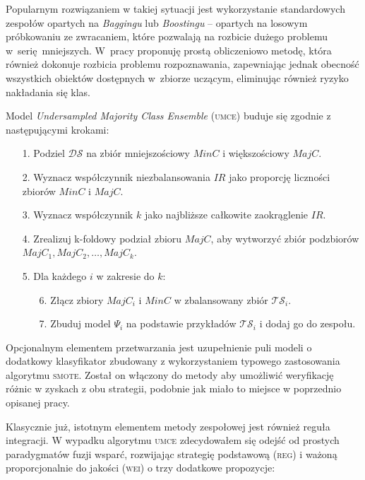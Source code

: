 Popularnym rozwiązaniem w takiej sytuacji jest wykorzystanie standardowych zespołów opartych na \emph{Baggingu} lub \emph{Boostingu} -- opartych na losowym próbkowaniu ze zwracaniem, które pozwalają na rozbicie dużego problemu w~serię mniejszych. W~pracy proponuję prostą obliczeniowo metodę, która również dokonuje rozbicia problemu rozpoznawania, zapewniając jednak obecność wszystkich obiektów dostępnych w~zbiorze uczącym, eliminując również ryzyko nakładania się klas.

Model \emph{Undersampled Majority Class Ensemble} (\textsc{umce}) buduje się zgodnie z następującymi krokami:

\begin{fullwidth}\vspace{2em}
\hspace{1em}\begin{minipage}{30em}
\begin{itemize}
	\item[1.] Podziel $\mathcal{DS}$ na zbiór mniejszościowy $MinC$ i większościowy $MajC$.
	\item[2.] Wyznacz współczynnik niezbalansowania $IR$ jako proporcję liczności zbiorów $MinC$ i $MajC$.
	\item[3.] Wyznacz współczynnik $k$ jako najbliższe całkowite zaokrąglenie $IR$.
	\item[4.] Zrealizuj k-foldowy podział zbioru $MajC$, aby wytworzyć zbiór podzbiorów $MajC_1, MajC_2, \ldots, MajC_k$.
	\item[5.] Dla każdego $i$ w zakresie do $k$:
	\begin{itemize}
		\item[6.] Złącz zbiory $MajC_i$ i $MinC$ w zbalansowany zbiór $\mathcal{TS}_i$.
		\item[7.] Zbuduj model $\Psi_i$ na podstawie przykładów $\mathcal{TS}_i$ i dodaj go do zespołu.
	\end{itemize} 
\end{itemize}
\end{minipage}\vspace{2em}
\end{fullwidth}

Opcjonalnym elementem przetwarzania jest uzupełnienie puli modeli o dodatkowy klasyfikator zbudowany z wykorzystaniem typowego zastosowania algorytmu \textsc{smote}. Został on włączony do metody aby umożliwić weryfikację różnic w zyskach z obu strategii, podobnie jak miało to miejsce w poprzednio opisanej pracy.

Klasycznie już, istotnym elementem metody zespołowej jest również reguła integracji. W wypadku algorytmu \textsc{umce} zdecydowałem się odejść od prostych paradygmatów fuzji wsparć, rozwijając strategię podstawową (\textsc{reg}) i ważoną proporcjonalnie do jakości (\textsc{wei}) o trzy dodatkowe propozycje:

